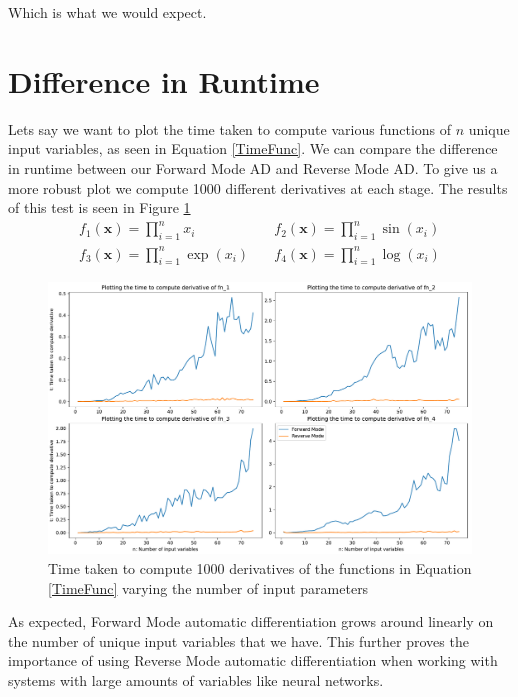 \documentclass{article}
\begin{document}
Which is what we would expect.




\section{Difference in Runtime}

Lets say we want to plot the time taken to compute various functions of $n$ unique input variables, as seen in Equation \ref{TimeFunc}. We can compare the difference in runtime between our Forward Mode AD and Reverse Mode AD. To give us a more robust plot we compute 1000 different derivatives at each stage. The results of this test is seen in Figure \ref{fig:TimeDiff}
\begin{equation} 
    \label{TimeFunc}
    \begin{split}
        f_1(\textbf{x}) = \prod_{i=1}^n x_i & \quad f_2(\textbf{x}) = \prod_{i=1}^n \sin(x_i) \\
        f_3(\textbf{x}) = \prod_{i=1}^n \exp(x_i) & \quad f_4(\textbf{x}) = \prod_{i=1}^n \log(x_i)
    \end{split}
\end{equation}

\begin{figure}[h]
    \centering
    \includegraphics[width=15cm]{images/Time_Difference_Example2.pdf}
    \caption{Time taken to compute 1000 derivatives of the functions in Equation \ref{TimeFunc} varying the number of input parameters}
    \label{fig:TimeDiff}
\end{figure}

As expected, Forward Mode automatic differentiation grows around linearly on the number of unique input variables that we have. This further proves the importance of using Reverse Mode automatic differentiation when working with systems with large amounts of variables like neural networks.
\end{document}

